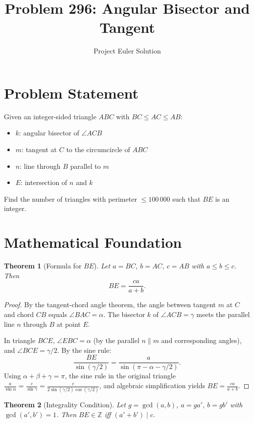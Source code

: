\documentclass[12pt]{article}
\title{Problem 296: Angular Bisector and Tangent}
\author{Project Euler Solution}
\date{}
\newtheorem{theorem}{Theorem}
\begin{document}
\maketitle

\section{Problem Statement}
Given an integer-sided triangle $ABC$ with $BC \leq AC \leq AB$:
\begin{itemize}
\item $k$: angular bisector of $\angle ACB$
\item $m$: tangent at $C$ to the circumcircle of $ABC$
\item $n$: line through $B$ parallel to $m$
\item $E$: intersection of $n$ and $k$
\end{itemize}
Find the number of triangles with perimeter $\leq 100\,000$ such that $BE$ is an integer.

\section{Mathematical Foundation}

\begin{theorem}[Formula for $BE$]
Let $a = BC$, $b = AC$, $c = AB$ with $a \leq b \leq c$. Then
\[
BE = \frac{ca}{a+b}.
\]
\end{theorem}

\begin{proof}
By the tangent-chord angle theorem, the angle between tangent $m$ at $C$ and chord $CB$ equals $\angle BAC = \alpha$. The bisector $k$ of $\angle ACB = \gamma$ meets the parallel line $n$ through $B$ at point $E$.

In triangle $BCE$, $\angle EBC = \alpha$ (by the parallel $n \| m$ and corresponding angles), and $\angle BCE = \gamma/2$. By the sine rule:
\[
\frac{BE}{\sin(\gamma/2)} = \frac{a}{\sin(\pi - \alpha - \gamma/2)}.
\]
Using $\alpha + \beta + \gamma = \pi$, the sine rule in the original triangle $\frac{a}{\sin\alpha} = \frac{c}{\sin\gamma} = \frac{c}{2\sin(\gamma/2)\cos(\gamma/2)}$, and algebraic simplification yields $BE = \frac{ca}{a+b}$.
\end{proof}

\begin{theorem}[Integrality Condition]
Let $g = \gcd(a,b)$, $a = ga'$, $b = gb'$ with $\gcd(a',b') = 1$. Then $BE \in \mathbb{Z}$ iff $(a'+b') \mid c$.
\end{theorem}
\end{document}
